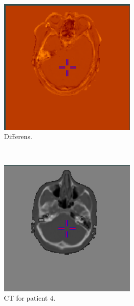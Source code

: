 \begin{figure}
\begin{subfigure}[b]{0.3\textwidth}
        \includegraphics[width=0.75\textwidth]{colager/loocv_ct/loocv_010850_sub.png}
        \caption{Differens.}
        \label{col:loocv_ct_pat3_sub}
    \end{subfigure}\\
    \begin{subfigure}[b]{0.3\textwidth}
        \centering
        \includegraphics[width=0.75\textwidth]{colager/loocv_ct/loocv_010960_ct.png}
        \caption{CT for patient 4.}
        \label{col:loocv_ct_pat4_ct}
    \end{subfigure}\hfill
    \begin{subfigure}[b]{0.3\textwidth}
        \centering

\end{subfigure}
\end{figure}
